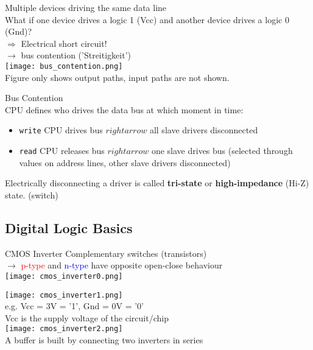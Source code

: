 \begin{corollary}{Multiple devices driving the same data line}\\
    What if one device drives a logic 1 (Vcc) and another device drives a logic 0 (Gnd)?\\
    $\Rightarrow$ Electrical short circuit!
    \\ $\rightarrow$ bus contention ('Streitigkeit')\\
    \texttt{[image: bus\_contention.png]}\\
    \small{Figure only shows output paths, input paths are not shown.}

\end{corollary}

\begin{concept}{Bus Contention} \\
    CPU defines who drives the data bus at which moment in time:
    \begin{itemize}
        \item \texttt{write} CPU drives bus $rightarrow$ all slave drivers disconnected
        \item \texttt{read} CPU releases bus $rightarrow$ one slave drives bus (selected through values on address lines, other slave drivers disconnected)
    \end{itemize}
    
    Electrically disconnecting a driver is called \textbf{tri-state} or \textbf{high-impedance} (Hi-Z) state. (switch)
    
\end{concept}

\multend


\subsection{Digital Logic Basics}

\begin{definition}{CMOS Inverter}
    Complementary switches (transistors)\\
    $\rightarrow$ \textcolor{red}{p-type} and \textcolor{blue}{n-type} have opposite open-close behaviour\\
    \texttt{[image: cmos\_inverter0.png]}

    \texttt{[image: cmos\_inverter1.png]}\\
    e.g. Vcc = 3V = '1', Gnd = 0V = '0'\\
    Vcc is the supply voltage of the circuit/chip
    \vspace{2mm}\\
    \texttt{[image: cmos\_inverter2.png]}\\
    A buffer is built by connecting two inverters in series
\end{definition}

